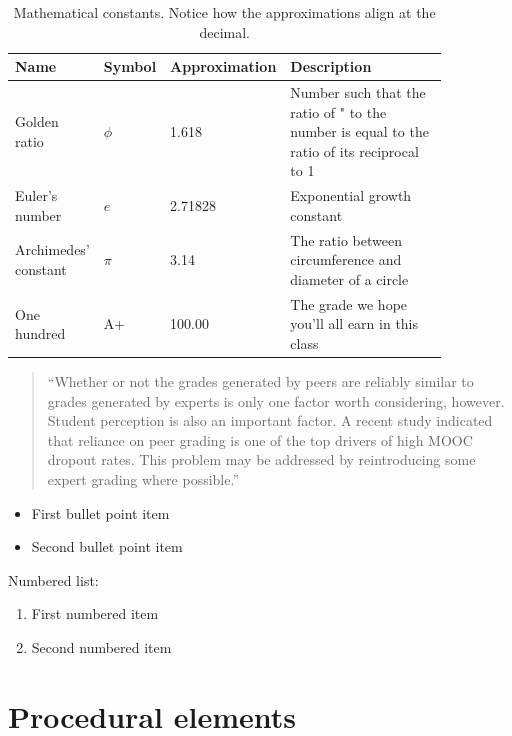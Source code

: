 \documentclass[
	letterpaper, %
]{jdf}
\begin{document}
\begin{table}[h] %
	\caption{Mathematical constants. Notice how the approximations align at the decimal.}
	\small %
	\centering %
	\begin{tabular}{L{0.17\linewidth} C{0.12\linewidth} L{0.17\linewidth} L{0.4\linewidth}}
		\textbf{Name} & \textbf{Symbol} & \textbf{Approximation} & \textbf{Description} \\
		\toprule[0.5pt]
		Golden ratio & $\phi$ & 1.618 & Number such that the ratio of " to the number is equal to the ratio of its reciprocal to 1\\
		\midrule
		Euler's number & $e$ & 2.71828 & Exponential growth constant\\
		\midrule
		Archimedes' constant & $\pi$ & 3.14 & The ratio between circumference and diameter of a circle\\
		\midrule
		One hundred & A+ & 100.00 & The grade we hope you’ll all earn in this class\\
	\end{tabular}
\end{table}


\begin{quotation}
	\noindent “Whether or not the grades generated by peers are reliably similar to grades generated by experts is only one factor worth considering, however. Student perception is also an important factor. A recent study indicated that reliance on peer grading is one of the top drivers of high MOOC dropout rates. This problem may be addressed by reintroducing some expert grading where possible.” %
\end{quotation}


\begin{itemize}
	\item First bullet point item
	\item Second bullet point item
\end{itemize}

Numbered list:

\begin{enumerate}
	\item First numbered item
	\item Second numbered item
\end{enumerate}

\section{Procedural elements}
\end{document}

